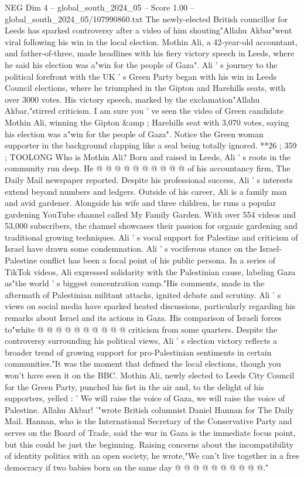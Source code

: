 \begin{textsample}{NEG Dim 4 – global\_south\_2024\_05 – Score 1.00 – global\_south\_2024\_05/107990860.txt}  \label{ex:f4_neg_280}
The newly-elected British councillor for Leeds has sparked controversy after a video of him shouting"Allahu Akbar"went viral following his win in the local election.
Mothin Ali, a 42-year-old accountant, and father-of-three, made headlines with his fiery victory speech in Leeds, where he said his election was a"win for the people of Gaza".
Ali ' s journey to the political forefront with the UK ' s Green Party began with his win in Leeds Council elections, where he triumphed in the Gipton and Harehills seats, with over 3000 votes.
His victory speech, marked by the exclamation"Allahu Akbar,"stirred criticism.
I am sure you ' ve seen the video of Green candidate Mothin Ali, winning the Gipton \&amp ; Harehills seat with 3,070 votes, saying his election was a"win for the people of Gaza".
Notice the Green woman supporter in the background clapping like a seal being totally ignored. **26 ; 359 ; TOOLONG Who is Mothin Ali?
Born and raised in Leeds, Ali ' s roots in the community run deep.
He @ @ @ @ @ @ @ @ @ @ of his accountancy firm, The Daily Mail newspaper reported.
Despite his professional success, Ali ' s interests extend beyond numbers and ledgers.
Outside of his career, Ali is a family man and avid gardener.
Alongside his wife and three children, he runs a popular gardening YouTube channel called My Family Garden.
With over 554 videos and 53,000 subscribers, the channel showcases their passion for organic gardening and traditional growing techniques.
Ali ' s vocal support for Palestine and criticism of Israel have drawn some condemnation.
Ali ' s vociferous stance on the Israel-Palestine conflict has been a focal point of his public persona.
In a series of TikTok videos, Ali expressed solidarity with the Palestinian cause, labeling Gaza as"the world ' s biggest concentration camp."His comments, made in the aftermath of Palestinian militant attacks, ignited debate and scrutiny.
Ali ' s views on social media have sparked heated discussions, particularly regarding his remarks about Israel and its actions in Gaza.
His comparison of Israeli forces to"white @ @ @ @ @ @ @ @ @ @ criticism from some quarters.
Despite the controversy surrounding his political views, Ali ' s election victory reflects a broader trend of growing support for pro-Palestinian sentiments in certain communities."It was the moment that defined the local elections, though you won't have seen it on the BBC.
Mothin Ali, newly elected to Leeds City Council for the Green Party, punched his fist in the air and, to the delight of his supporters, yelled : ' We will raise the voice of Gaza, we will raise the voice of Palestine.
Allahu Akbar! '"wrote British columnist Daniel Hannan for The Daily Mail.
Hannan, who is the International Secretary of the Conservative Party and serves on the Board of Trade, said the war in Gaza is the immediate focus point, but this could be just the beginning.
Raising concerns about the incompatibility of identity politics with an open society, he wrote,"We can't live together in a free democracy if two babies born on the same day @ @ @ @ @ @ @ @ @ @."

\end{textsample}
